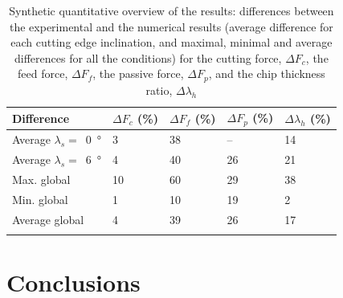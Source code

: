 \documentclass[preprint,12pt,times]{elsarticle}
\newcommand{\snsp}[2]{{#1}_{\!#2}}    %
\begin{document}
%
\begin{table}[!h]
\begin{center}
\caption{\label{tab:Synth} Synthetic quantitative overview of the results: differences between the experimental and the numerical results (average difference for each cutting edge inclination, and maximal, minimal and average differences for all the conditions) for the cutting force, $\Delta \snsp{F}{c}$, the feed force, $\Delta \snsp{F}{f}$, the passive force, $\Delta \snsp{F}{p}$, and the chip thickness ratio, $\Delta \lambda_h$}
\begin{tabular}{lllll}
\hline\noalign{\smallskip}
Difference & $\Delta \snsp{F}{c}$ (\unit{\%}) & $\Delta \snsp{F}{f}$ (\unit{\%}) & $\Delta \snsp{F}{p}$ (\unit{\%}) & $\Delta \lambda_h$ (\unit{\%})\\
\hline\noalign{\smallskip}
Average $\lambda_s =$~\qty{0}{\degree} & 3 & 38 & -- & 14\\
Average $\lambda_s =$~\qty{6}{\degree} & 4 & 40 & 26 & 21\\
Max. global & 10 & 60 & 29 & 38\\
Min. global & 1 & 10 & 19 & 2\\
Average global & 4 & 39 & 26 & 17\\
\noalign{\smallskip}\hline\noalign{\smallskip}
\end{tabular}
\end{center}
\end{table}
%

\section{Conclusions}
\end{document}
